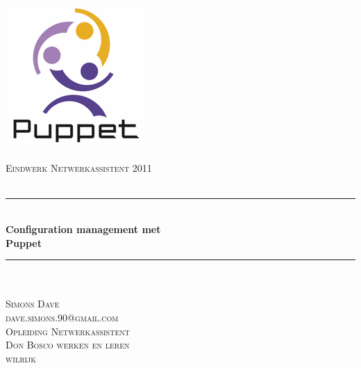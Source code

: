 \documentclass[titlepage]{book}
\newcommand{\HRule}{\rule{\linewidth}{0.5mm}}
\begin{document}
\begin{titlepage}
\begin{center}

\includegraphics{src/puppet_logo.png}\\
\textsc{\Large }\\[2.5cm]

\textsc{\Large Eindwerk Netwerkassistent 2011}\\
\textsc{\Large }\\[-0.5cm]
\HRule\\
{\huge{\bfseries Configuration management met\\Puppet}}
\HRule\\
\textsc{\Large }\\[2.5cm]

\textsc{Simons Dave}\\
\textsc{dave.simons.90@gmail.com}\\
\textsc{Opleiding Netwerkassistent}\\
\textsc{Don Bosco werken en leren}\\
\textsc{wilrijk}\\

\end{center}
\end{titlepage}
\end{document}
